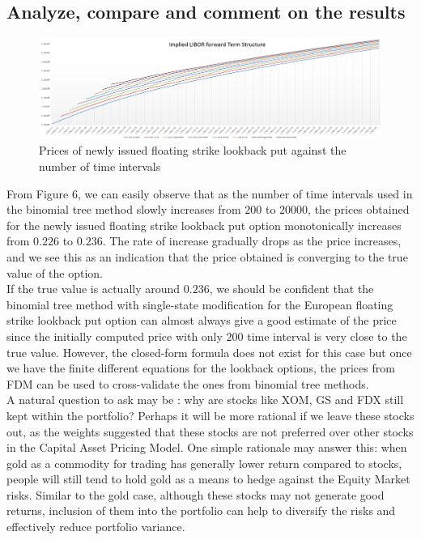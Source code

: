 \subsection{Analyze, compare and comment on the results}
\begin{figure}[h]
	\centering
	\includegraphics[scale=0.4]{biu.PNG}
	\caption{Prices of newly issued floating strike lookback put against the number of time intervals}
\end{figure}
From Figure 6, we can easily observe that as the number of time intervals used in the binomial tree method slowly increases from $200$ to $20000$, the prices obtained for the newly issued floating strike lookback put option monotonically increases from $0.226$ to $0.236$. The rate of increase gradually drops as the price increases, and we see this as an indication that the price obtained is converging to the true value of the option.\\[4mm]
If the true value is actually around $0.236$, we should be confident that the binomial tree method with single-state modification for the European floating strike lookback put option can almost always give a good estimate of the price since the initially computed price with only $200$ time interval is very close to the true value. However, the closed-form formula does not exist for this case but once we have the finite different equations for the lookback options, the prices from FDM can be used to cross-validate the ones from binomial tree methods.\\[4mm]
A natural question to ask may be : why are stocks like XOM, GS and FDX still kept within the portfolio? Perhaps it will be more rational if we leave these stocks out, as the weights suggested that these stocks are not preferred over other stocks in the Capital Asset Pricing Model. One simple rationale may answer this: when gold as a commodity for trading has generally lower return compared to stocks, people will still tend to hold gold as a means to hedge against the Equity Market risks. Similar to the gold case, although these stocks may not generate good returns, inclusion of them into the portfolio can help to diversify the risks and effectively reduce portfolio variance.\\[4mm]
